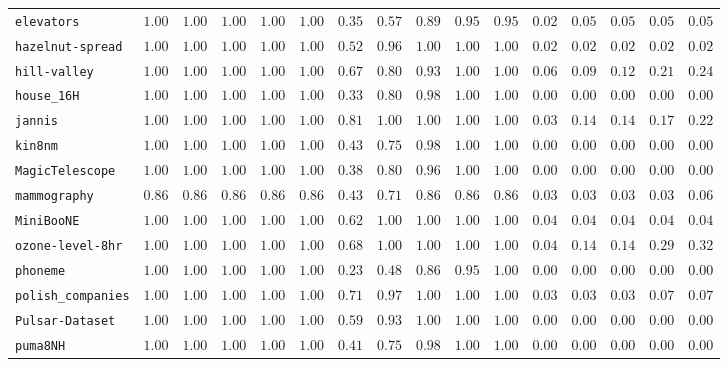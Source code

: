 {\begin{tabular}{@{}lccccccccccccccc@{}}
\texttt{elevators} & $1.00$ & $1.00$ & $1.00$ & $1.00$ & $1.00$ & $0.35$ & $0.57$ & $0.89$ & $0.95$ & $0.95$ & $0.02$ & $0.05$ & $0.05$ & $0.05$ & $0.05$ \\
\texttt{hazelnut-spread} & $1.00$ & $1.00$ & $1.00$ & $1.00$ & $1.00$ & $0.52$ & $0.96$ & $1.00$ & $1.00$ & $1.00$ & $0.02$ & $0.02$ & $0.02$ & $0.02$ & $0.02$ \\
\texttt{hill-valley} & $1.00$ & $1.00$ & $1.00$ & $1.00$ & $1.00$ & $0.67$ & $0.80$ & $0.93$ & $1.00$ & $1.00$ & $0.06$ & $0.09$ & $0.12$ & $0.21$ & $0.24$ \\
\texttt{house\_16H} & $1.00$ & $1.00$ & $1.00$ & $1.00$ & $1.00$ & $0.33$ & $0.80$ & $0.98$ & $1.00$ & $1.00$ & $0.00$ & $0.00$ & $0.00$ & $0.00$ & $0.00$ \\
\texttt{jannis} & $1.00$ & $1.00$ & $1.00$ & $1.00$ & $1.00$ & $0.81$ & $1.00$ & $1.00$ & $1.00$ & $1.00$ & $0.03$ & $0.14$ & $0.14$ & $0.17$ & $0.22$ \\
\texttt{kin8nm} & $1.00$ & $1.00$ & $1.00$ & $1.00$ & $1.00$ & $0.43$ & $0.75$ & $0.98$ & $1.00$ & $1.00$ & $0.00$ & $0.00$ & $0.00$ & $0.00$ & $0.00$ \\
\texttt{MagicTelescope} & $1.00$ & $1.00$ & $1.00$ & $1.00$ & $1.00$ & $0.38$ & $0.80$ & $0.96$ & $1.00$ & $1.00$ & $0.00$ & $0.00$ & $0.00$ & $0.00$ & $0.00$ \\
\texttt{mammography} & $0.86$ & $0.86$ & $0.86$ & $0.86$ & $0.86$ & $0.43$ & $0.71$ & $0.86$ & $0.86$ & $0.86$ & $0.03$ & $0.03$ & $0.03$ & $0.03$ & $0.06$ \\
\texttt{MiniBooNE} & $1.00$ & $1.00$ & $1.00$ & $1.00$ & $1.00$ & $0.62$ & $1.00$ & $1.00$ & $1.00$ & $1.00$ & $0.04$ & $0.04$ & $0.04$ & $0.04$ & $0.04$ \\
\texttt{ozone-level-8hr} & $1.00$ & $1.00$ & $1.00$ & $1.00$ & $1.00$ & $0.68$ & $1.00$ & $1.00$ & $1.00$ & $1.00$ & $0.04$ & $0.14$ & $0.14$ & $0.29$ & $0.32$ \\
\texttt{phoneme} & $1.00$ & $1.00$ & $1.00$ & $1.00$ & $1.00$ & $0.23$ & $0.48$ & $0.86$ & $0.95$ & $1.00$ & $0.00$ & $0.00$ & $0.00$ & $0.00$ & $0.00$ \\
\texttt{polish\_companies} & $1.00$ & $1.00$ & $1.00$ & $1.00$ & $1.00$ & $0.71$ & $0.97$ & $1.00$ & $1.00$ & $1.00$ & $0.03$ & $0.03$ & $0.03$ & $0.07$ & $0.07$ \\
\texttt{Pulsar-Dataset} & $1.00$ & $1.00$ & $1.00$ & $1.00$ & $1.00$ & $0.59$ & $0.93$ & $1.00$ & $1.00$ & $1.00$ & $0.00$ & $0.00$ & $0.00$ & $0.00$ & $0.00$ \\
\texttt{puma8NH} & $1.00$ & $1.00$ & $1.00$ & $1.00$ & $1.00$ & $0.41$ & $0.75$ & $0.98$ & $1.00$ & $1.00$ & $0.00$ & $0.00$ & $0.00$ & $0.00$ & $0.00$ \\

\end{tabular}}
